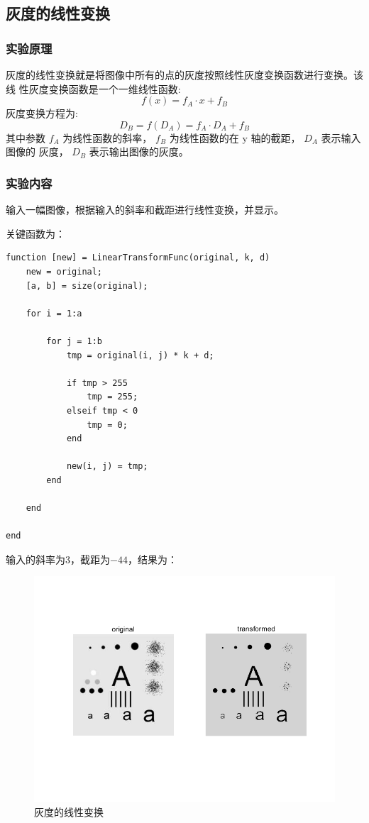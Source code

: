 \documentclass{ctexart}
\begin{document}
\subsection{\hei 灰度的线性变换}
\subsubsection{\hei 实验原理}
灰度的线性变换就是将图像中所有的点的灰度按照线性灰度变换函数进行变换。该线 性灰度变换函数是一个一维线性函数:
$$
    f(x)=f_{A} \cdot x+f_{B}
$$
灰度变换方程为:
$$D_{B}=f\left(D_{A}\right)=f_{A} \cdot D_{A}+f_{B}$$
其中参数 $f_{A}$ 为线性函数的斜率， $f_{B}$ 为线性函数的在 y 轴的截距， $D_{A}$ 表示输入图像的 灰度， $D_{B}$ 表示输出图像的灰度。
\subsubsection{\hei 实验内容}
输入一幅图像，根据输入的斜率和截距进行线性变换，并显示。
\par 关键函数为：
\begin{lstlisting}[frame=single]
function [new] = LinearTransformFunc(original, k, d)
    new = original;
    [a, b] = size(original);

    for i = 1:a

        for j = 1:b
            tmp = original(i, j) * k + d;

            if tmp > 255
                tmp = 255;
            elseif tmp < 0
                tmp = 0;
            end

            new(i, j) = tmp;
        end

    end

end
\end{lstlisting}
\par 输入的斜率为$3$，截距为$-44$，结果为：
\begin{figure}[H]
    \centering
    \includegraphics[scale=0.4]{2_1.png}
    \caption{灰度的线性变换}
\end{figure}
\end{document}
